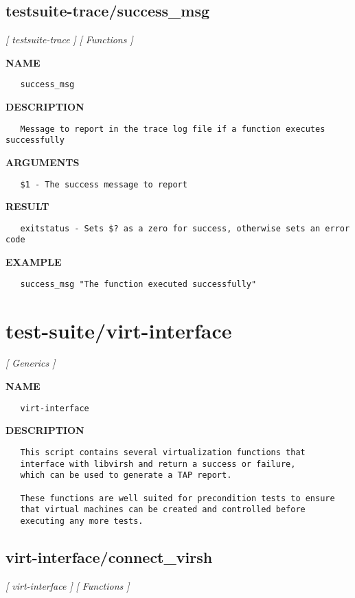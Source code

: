 \subsection{testsuite-trace/success\_msg}
\textsl{[ testsuite-trace ]}
\textsl{[ Functions ]}

\label{ch:robo48}
\label{ch:testsuite_trace_success_msg}
\textbf{NAME}
\begin{verbatim}
   success_msg
\end{verbatim}
\textbf{DESCRIPTION}
\begin{verbatim}
   Message to report in the trace log file if a function executes successfully
\end{verbatim}
\textbf{ARGUMENTS}
\begin{verbatim}
   $1 - The success message to report
\end{verbatim}
\textbf{RESULT}
\begin{verbatim}
   exitstatus - Sets $? as a zero for success, otherwise sets an error code
\end{verbatim}
\textbf{EXAMPLE}
\begin{verbatim}
   success_msg "The function executed successfully"
\end{verbatim}
\newpage
\section{test-suite/virt-interface}
\textsl{[ Generics ]}

\label{ch:robo36}
\label{ch:test_suite_virt_interface}
\textbf{NAME}
\begin{verbatim}
   virt-interface
\end{verbatim}
\textbf{DESCRIPTION}
\begin{verbatim}
   This script contains several virtualization functions that
   interface with libvirsh and return a success or failure, 
   which can be used to generate a TAP report.

   These functions are well suited for precondition tests to ensure
   that virtual machines can be created and controlled before 
   executing any more tests.
\end{verbatim}
\newpage
\subsection{virt-interface/connect\_virsh}
\textsl{[ virt-interface ]}
\textsl{[ Functions ]}

